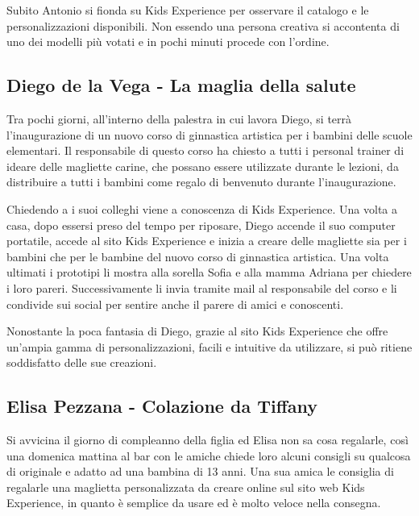\documentclass[12pt,italian,]{report}
\begin{document}
Subito Antonio si fionda su Kids Experience per osservare il catalogo e
le personalizzazioni disponibili. Non essendo una persona creativa si
accontenta di uno dei modelli più votati e in pochi minuti procede con
l'ordine.

\hypertarget{diego-de-la-vega---la-maglia-della-salute}{%
\subsection{Diego de la Vega - La maglia della
salute}\label{diego-de-la-vega---la-maglia-della-salute}}

Tra pochi giorni, all'interno della palestra in cui lavora Diego, si
terrà l'inaugurazione di un nuovo corso di ginnastica artistica per i
bambini delle scuole elementari. Il responsabile di questo corso ha
chiesto a tutti i personal trainer di ideare delle magliette carine, che
possano essere utilizzate durante le lezioni, da distribuire a tutti i
bambini come regalo di benvenuto durante l'inaugurazione.

Chiedendo a i suoi colleghi viene a conoscenza di Kids Experience. Una
volta a casa, dopo essersi preso del tempo per riposare, Diego accende
il suo computer portatile, accede al sito Kids Experience e inizia a
creare delle magliette sia per i bambini che per le bambine del nuovo
corso di ginnastica artistica. Una volta ultimati i prototipi li mostra
alla sorella Sofia e alla mamma Adriana per chiedere i loro pareri.
Successivamente li invia tramite mail al responsabile del corso e li
condivide sui social per sentire anche il parere di amici e conoscenti.

Nonostante la poca fantasia di Diego, grazie al sito Kids Experience che
offre un'ampia gamma di personalizzazioni, facili e intuitive da
utilizzare, si può ritiene soddisfatto delle sue creazioni.

\hypertarget{elisa-pezzana---colazione-da-tiffany}{%
\subsection{Elisa Pezzana - Colazione da
Tiffany}\label{elisa-pezzana---colazione-da-tiffany}}

Si avvicina il giorno di compleanno della figlia ed Elisa non sa cosa
regalarle, così una domenica mattina al bar con le amiche chiede loro
alcuni consigli su qualcosa di originale e adatto ad una bambina di 13
anni. Una sua amica le consiglia di regalarle una maglietta
personalizzata da creare online sul sito web Kids Experience, in quanto
è semplice da usare ed è molto veloce nella consegna.
\end{document}
